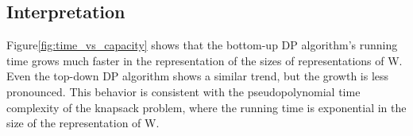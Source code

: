 \documentclass{article}
\begin{document}
\subsection{Interpretation}
Figure\ref{fig:time_vs_capacity} shows that the bottom-up DP algorithm's running time grows much faster in the representation of the sizes of representations of W. Even the top-down DP algorithm shows a similar trend, but the growth is less pronounced. This behavior is consistent with the pseudopolynomial time complexity of the knapsack problem, where the running time is exponential in the size
of the representation of W.
\end{document}
